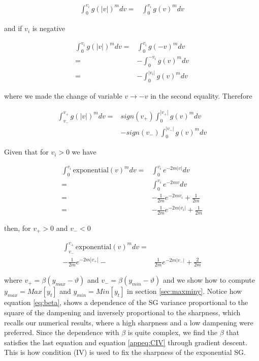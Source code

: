 \begin{align}
    \int^{v_i}_0 g(|v|)^mdv=&\int^{v_i}_0 g(v)^mdv
\end{align}

\noindent and if $v_i$ is negative

\begin{align}
    \int^{v_i}_0 g(|v|)^mdv=&\int^{v_i}_0 g(-v)^mdv \\
    =&-\int^{-v_i}_0 g(v)^mdv\\
    =&-\int^{|v_i|}_0 g(v)^mdv
\end{align}

\noindent where we made the change of variable $v\rightarrow -v$ in the second equality. Therefore


\begin{align}
    \int^{v_+}_{v_-} g(|v|)^mdv=&sign(v_+)\int^{|v_+|}_0 g(v)^mdv \\
    &- sign(v_-)\int^{|v_-|}_0 g(v)^mdv 
\end{align}

Given that for $v_i>0$ we have

\begin{align}
    \int^{v_i}_0 \text{exponential}(v)^mdv=&\int^{v_i}_0 e^{-2m|v|}dv\\
    =&\int^{v_i}_0 e^{-2mv}dv\\
    =&-\frac{1}{2m}e^{-2mv_i}+\frac{1}{2m}\\
    =&-\frac{1}{2m}e^{-2m|v_i|}+\frac{1}{2m}
\end{align}

\noindent then, for $v_+>0$ and $v_-<0$

\begin{align}\label{eqIVexp}
    \int^{v_+}_{v_-} \text{exponential}(v)^mdv=& \nonumber\\-\frac{1}{2m}e^{-2m|v_+|}-&\frac{1}{2m}e^{-2m|v_-|}+\frac{2}{2m}
\end{align}


\noindent where $v_+=\beta(y_{max}-\vartheta)$ and $v_-=\beta(y_{min}-\vartheta)$
and we show how to compute $y_{max}=Max[y_t]$ and $y_{min}=Min[y_t]$ in section \ref{sec:maxminy}. 
Notice how equation \ref{eq:beta}, shows a dependence of the SG variance  proportional to the square of the dampening and inversely proportional to the sharpness, which recalls our numerical results, where a high sharpness and a low dampening were preferred. Since the dependence with $\beta$ is quite complex, we find the $\beta$ that satisfies the last equation and equation \ref{appeq:CIV} through gradient descent.  This is how condition (IV) is used to fix the sharpness of the exponential SG.


